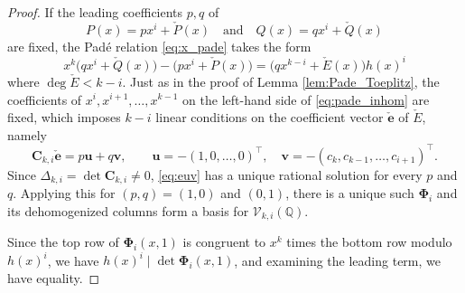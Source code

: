 \documentclass{article}
\numberwithin{equation}{section}
\theoremstyle{definition}
\theoremstyle{remark}
\newcommand{\QQ}{\mathbb{Q}}
\newcommand{\V}{\mathcal{V}}
\newcommand{\textand}{\quad \text{and} \quad}
\newcommand{\<}{\left\langle}
\renewcommand{\>}{\right\rangle}
\begin{document}
\begin{proof}
  If the leading coefficients $p, q$ of
  \begin{equation*}
    P(x) = p x^i + \check P(x) \textand Q(x) = q x^i + \check Q(x)
  \end{equation*}
  are fixed, the Pad\'e relation \eqref{eq:x_pade} takes the form
  \begin{equation} \label{eq:pade_inhom}
    x^k \big(q x^i + \check Q(x)\big) - \big(p x^i + \check P(x)\big) = \big(q x^{k-i} + \check E(x)\big) h(x)^i
  \end{equation}
  where $\deg \check E < k - i$. Just as in the proof of Lemma \ref{lem:Pade_Toeplitz}, the coefficients of $x^i, x^{i+1}, \ldots, x^{k-1}$ on the left-hand side of \eqref{eq:pade_inhom} are fixed, which imposes $k - i$ linear conditions on the coefficient vector $\check{\mathbf e}$ of $\check E$, namely
  \begin{equation} \label{eq:euv}
    \mathbf{C}_{k, i} \check{\mathbf e} = p \mathbf{u} + q \mathbf{v}, \qquad \mathbf{u} = -(1, 0, \ldots, 0)^\top, \quad \mathbf{v} = -(c_k, c_{k-1}, \ldots, c_{i+1})^\top.
  \end{equation}
  Since $\Delta_{k,i} = \det \mathbf{C}_{k,i} \neq 0$, \eqref{eq:euv} has a unique rational solution for every $p$ and $q$. Applying this for $(p,q) = (1,0)$ and $(0,1)$, there is a unique such $\boldsymbol{\Phi}_i$ and its dehomogenized columns form a basis for $\V_{k,i}(\QQ)$.

  Since the top row of $\boldsymbol{\Phi}_i(x,1)$ is congruent to $x^k$ times the bottom row modulo $h(x)^i$, we have $h(x)^i \mid \det \boldsymbol{\Phi}_i(x, 1)$, and examining the leading term, we have equality.
\end{proof}
\end{document}
